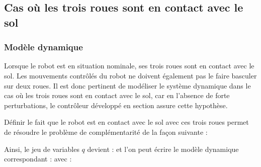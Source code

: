 		\subsection{Cas où les trois roues sont en contact avec le sol}
			\label{section.modelisation_trois_roues}
			
			\subsubsection{Modèle dynamique}
				
				Lorsque le robot est en situation nominale, ses trois roues sont en contact avec le sol. 
				Les mouvements contrôlés du robot ne doivent également pas le faire basculer sur deux roues.
				Il est donc pertinent de modéliser le système dynamique dans le cas où les trois roues sont en contact avec le sol, 
				car en l'absence de forte perturbations, le contrôleur développé en section  assure cette hypothèse.
			
				Définir le fait que le robot est en contact avec le sol avec ces trois roues permet de résoudre le problème de complémentarité de la façon suivante :
				
				Ainsi, le jeu de variables $q$ devient :
				et l'on peut écrire le modèle dynamique correspondant :
				avec :			
			
